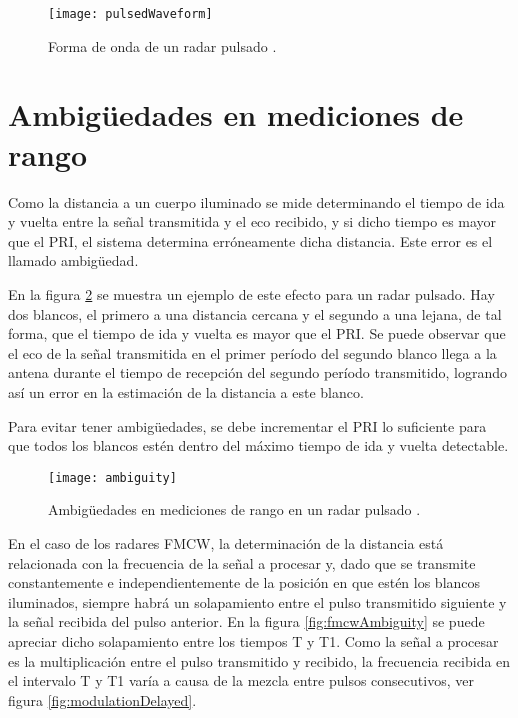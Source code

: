 \begin{figure}
 \centering
 \texttt{[image: pulsedWaveform]}
 \caption{Forma de onda de un radar pulsado \cite{Richards2010}.}
 \label{fig:pulsedWaveform}
\end{figure}

\section{Ambigüedades en mediciones de rango} \label{sc:ambiguity}

Como la distancia a un cuerpo iluminado se mide determinando el tiempo de ida y vuelta entre la señal transmitida y el eco recibido, y si dicho tiempo es mayor que el PRI, el sistema determina erróneamente dicha distancia. Este error es el llamado ambigüedad.

En la figura \ref{fig:ambiguity} se muestra un ejemplo de este efecto para un radar pulsado. Hay dos blancos, el primero a una distancia cercana y el segundo a una lejana, de tal forma, que el tiempo de ida y vuelta es mayor que el PRI. Se puede observar que el eco de la señal transmitida en el primer período del segundo blanco llega a la antena durante el tiempo de recepción del segundo período transmitido, logrando así un error en la estimación de la distancia a este blanco.

Para evitar tener ambigüedades, se debe incrementar el PRI lo suficiente para que todos los blancos estén dentro del máximo tiempo de ida y vuelta detectable.

\begin{figure}
 \centering
 \texttt{[image: ambiguity]}
 \caption{Ambigüedades en mediciones de rango en un radar pulsado \cite{Richards2010}.}
 \label{fig:ambiguity}
\end{figure}

En el caso de los radares FMCW, la determinación de la distancia está relacionada con la frecuencia de la señal a procesar y, dado que se transmite constantemente e independientemente de la posición en que estén los blancos iluminados, siempre habrá un solapamiento entre el pulso transmitido siguiente y la señal recibida del pulso anterior. En la figura \ref{fig:fmcwAmbiguity} se puede apreciar dicho solapamiento entre los tiempos T y T1. Como la señal a procesar es la multiplicación entre el pulso transmitido y recibido, la frecuencia recibida en el intervalo T y T1 varía a causa de la mezcla entre pulsos consecutivos, ver figura \ref{fig:modulationDelayed}.

